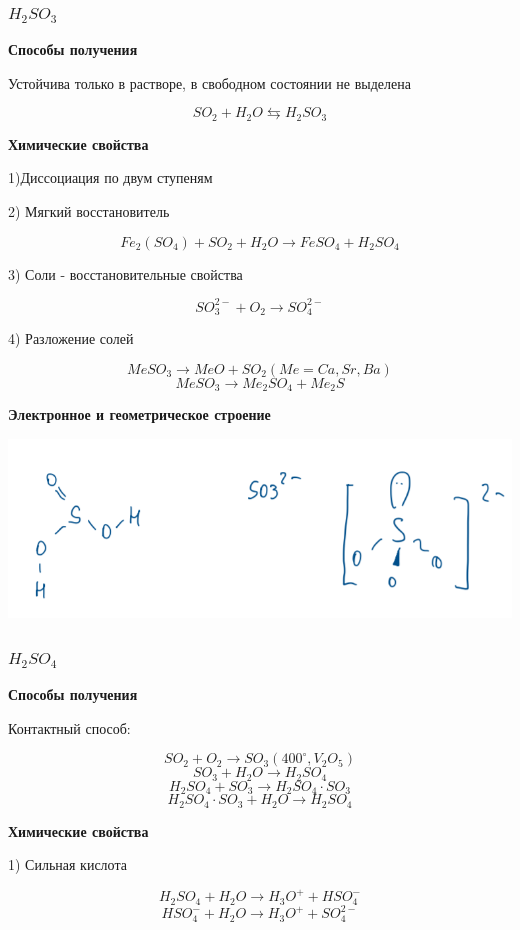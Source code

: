 \documentclass[14pt,a4paper]{scrartcl}
\begin{document}
\subsubsection{$H_2SO_3$}

\textbf{Способы получения}

 Устойчива только в растворе, в свободном состоянии не выделена

$$SO_2 + H_2O \leftrightarrows H_2SO_3$$

\textbf{Химические свойства}

1)Диссоциация по двум ступеням

2) Мягкий восстановитель

$$Fe_2(SO_4) + SO_2 + H_2O \rightarrow FeSO_4 + H_2SO_4$$

3) Соли - восстановительные свойства

$$SO_3^{2-} + O_2 \rightarrow  SO_4^{2-}$$

4) Разложение солей

$$MeSO_3 \rightarrow MeO + SO_2 (Me = Ca, Sr, Ba)$$
$$MeSO_3 \rightarrow Me_2SO_4 + Me_2S$$

\textbf{Электронное и геометрическое строение}

\includegraphics{7v6.png}

\subsubsection{$H_2SO_4$}

\textbf{Способы получения}

Контактный способ:

$$SO_2 + O_2 \rightarrow SO_3(400^{\circ}, V_2O_5)$$
$$SO_3 + H_2O \rightarrow H_2SO_4$$
$$H_2SO_4 + SO_3 \rightarrow H_2SO_4\cdot SO_3$$
$$H_2SO_4\cdot SO_3 +H_2O \rightarrow H_2SO_4$$

\textbf{Химические свойства}

1) Сильная кислота

$$H_2SO_4 + H_2O \rightarrow H_3O^+ + HSO_4^-$$
$$HSO_4^- + H_2O \rightarrow H_3O^+ + SO_4^{2-}$$
\end{document}
